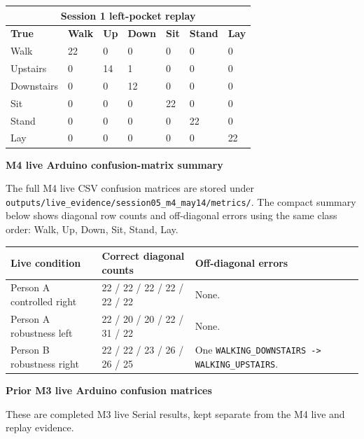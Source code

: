 \documentclass[11pt,a4paper]{article}
\begin{document}
\begin{center}
\scriptsize
\begin{tabular}{|p{2.2cm}|p{1.0cm}|p{1.0cm}|p{1.0cm}|p{1.0cm}|p{1.0cm}|p{1.0cm}|}
\hline
\multicolumn{7}{|c|}{\cellcolor{headergray}\textbf{Session 1 left-pocket replay}}\\
\hline
\rowcolor{headergray}
\textbf{True} & \textbf{Walk} & \textbf{Up} & \textbf{Down} & \textbf{Sit} & \textbf{Stand} & \textbf{Lay}\\
\hline
Walk & 22 & 0 & 0 & 0 & 0 & 0\\
\hline
Upstairs & 0 & 14 & 1 & 0 & 0 & 0\\
\hline
Downstairs & 0 & 0 & 12 & 0 & 0 & 0\\
\hline
Sit & 0 & 0 & 0 & 22 & 0 & 0\\
\hline
Stand & 0 & 0 & 0 & 0 & 22 & 0\\
\hline
Lay & 0 & 0 & 0 & 0 & 0 & 22\\
\hline
\end{tabular}
\end{center}
\normalsize

\textbf{M4 live Arduino confusion-matrix summary}

The full M4 live CSV confusion matrices are stored under \texttt{outputs/live\_evidence/session05\_m4\_may14/metrics/}. The compact summary below shows diagonal row counts and off-diagonal errors using the same class order: Walk, Up, Down, Sit, Stand, Lay.

\begin{center}
\small
\begin{tabular}{|p{3.6cm}|p{4.4cm}|p{5.1cm}|}
\hline
\rowcolor{headergray}
\textbf{Live condition} & \textbf{Correct diagonal counts} & \textbf{Off-diagonal errors}\\
\hline
Person A controlled right & 22 / 22 / 22 / 22 / 22 / 22 & None.\\
\hline
Person A robustness left & 22 / 20 / 20 / 22 / 31 / 22 & None.\\
\hline
Person B robustness right & 22 / 22 / 23 / 26 / 26 / 25 & One \texttt{WALKING\_DOWNSTAIRS -> WALKING\_UPSTAIRS}.\\
\hline
\end{tabular}
\end{center}
\normalsize

\textbf{Prior M3 live Arduino confusion matrices}

These are completed M3 live Serial results, kept separate from the M4 live and replay evidence.
\end{document}
